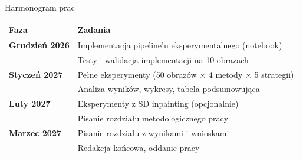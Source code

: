 \documentclass[aspectratio=169, 12pt]{beamer}
\begin{document}
\begin{frame}{Harmonogram prac}
  \renewcommand{\arraystretch}{1.3}
  \begin{tabular}{>{\bfseries}p{2.8cm}
                  >{\raggedright\arraybackslash}p{8.5cm}}
    \toprule
    \textbf{Faza} & \textbf{Zadania} \\
    \midrule
    Grudzień 2026 &
      Implementacja pipeline'u eksperymentalnego (notebook)\\
      & Testy i walidacja implementacji na 10 obrazach \\

    Styczeń 2027 &
      Pełne eksperymenty (50 obrazów × 4 metody × 5 strategii)\\
      & Analiza wyników, wykresy, tabela podsumowująca \\

    Luty 2027 &
      Eksperymenty z SD inpainting (opcjonalnie) \\
      & Pisanie rozdziału metodologicznego pracy \\

    Marzec 2027 &
      Pisanie rozdziału z wynikami i wnioskami \\
      & Redakcja końcowa, oddanie pracy \\
    \bottomrule
  \end{tabular}
\end{frame}
\end{document}
